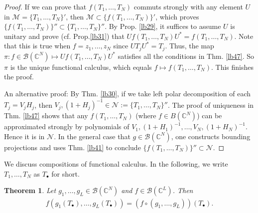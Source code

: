 \documentclass[12pt,b5paper,notitlepage]{article}
\theoremstyle{definition}
\newtheorem{rem}[df]{Remark}
\theoremstyle{plain}
\newtheorem{thm}[df]{Theorem}
\newcommand{\mc}{\mathcal}
\newcommand{\scr}{\mathscr}
\newcommand{\blt}{\bullet}
\newcommand{\Cbb}{\mathbb C}
\numberwithin{equation}{section}
\begin{document}
\begin{proof}
If we can prove that $f(T_1,\dots,T_N)$ commuts strongly with any element $U$ in $\mc M=\{T_1,\dots,T_N\}'$, then $\mc M\subset\{f(T_1,\dots,T_N)\}'$, which proves $\{f(T_1,\dots,T_N)\}''\subset \{T_1,\dots,T_N\}''$. By Prop. \ref{lb29}, it suffices to assume $U$ is unitary and prove (cf. Prop.\ref{lb31}) that $Uf(T_1,\dots,T_N)U^*=f(T_1,\dots,T_N)$. Note that this is true when $f=z_1,\dots,z_N$ since $UT_jU^*=T_j$. Thus, the map $\pi:f\in\scr B(\Cbb^N)\mapsto Uf(T_1,\dots,T_N)U^*$ satisfies all the conditions in Thm. \ref{lb47}. So $\pi$ is the unique functional calculus, which equals $f\mapsto f(T_1,\dots,T_N)$. This finishes the proof.

An alternative proof: By Thm. \ref{lb30}, if we take left polar decomposition of each $T_j=V_jH_j$, then $V_j,(1+H_j)^{-1}\in\mc N:=\{T_1,\dots,T_N\}''$. The proof of uniqueness in Thm. \ref{lb47} shows that any $f(T_1,\dots,T_N)$ (where $f\in B(\Cbb^N)$) can be approximated strongly by polynomials of $V_1,(1+H_1)^{-1},\dots,V_N,(1+H_N)^{-1}$. Hence it is in $\mc N$. In the general case that $g\in\scr B(\Cbb^N)$, one constructs bounding projections and uses Thm. \ref{lb41} to conclude $\{f(T_1,\dots,T_N)\}''\subset\mc N$.
\end{proof}



\begin{comment}
\begin{rem}
In \cite[Thm. 5.6.27]{Kad}, a version of uniqueness of unbounded Borel functional calculus $\pi$ (for a single normal closed operator $T$) was  provided. In that theorem, the condition $\{\pi(f)\}''\subset\{T\}''$ is assumed, which simplifies the proof a bit. In our Thm. \ref{lb47} (restricted to a single normal operator $T$), $\{\pi(f)\}''\subset\{T\}''$ is not an assumption but a consequence (Thm. \ref{lb50}). Thus, our Thm. \ref{lb47} is stronger than \cite[Thm. 5.6.27]{Kad}.
\end{rem}
\end{comment}



We discuss compositions of functional calculus. In the following, we write $T_1,\dots,T_N$ as $T_\blt$ for short.

\begin{thm}\label{lb48}
Let $g_1,\dots,g_L\in \scr B(\Cbb^N)$ and $f\in\scr B(\Cbb^L)$. Then
\begin{align}
f(g_1(T_\blt),\dots,g_L(T_\blt))=(f\circ(g_1,\dots,g_L))(T_\blt).\end{align}
\end{thm}
\end{document}
